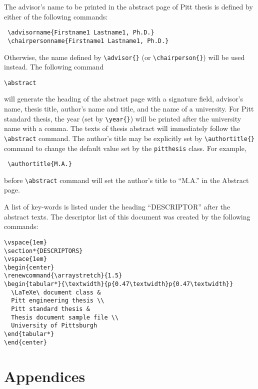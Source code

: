 The advisor's name to be printed in the abstract page of Pitt thesis is defined
by either of the following commands:
\begin{verbatim}
 \advisorname{Firstname1 Lastname1, Ph.D.}
 \chairpersonname{Firstname1 Lastname1, Ph.D.}
\end{verbatim}
Otherwise, the name defined by \verb|\advisor{}| (or \verb|\chairperson{}|) will be
used instead. The following command
\begin{verbatim}
\abstract
\end{verbatim}
will generate the heading of the abstract page with a signature field,
advisor's name, thesis title, author's name and title, and the name of
a university.	For Pitt standard thesis, the year (set by \verb|\year{}|)
will be printed after the university name with a comma.  The texts of thesis
abstract will immediately follow the \verb|\abstract| command.
The author's title may be explicitly set by \verb|\authortitle{}| command
to change the default value set by the \texttt{pitthesis} class.  For example,
\begin{verbatim}
 \authortitle{M.A.}
\end{verbatim}
before \verb|\abstract| command will set the author's title to ``M.A.'' in the
Abstract page.

A list of key-words is listed under the heading ``DESCRIPTOR'' after the
abstract texts.  The descriptor list of this document was created by the
following commands:
\begin{verbatim}
\vspace{1em}
\section*{DESCRIPTORS}
\vspace{1em}
\begin{center}
\renewcommand{\arraystretch}{1.5}
\begin{tabular*}{\textwidth}{p{0.47\textwidth}p{0.47\textwidth}}
  \LaTeXe\ document class &
  Pitt engineering thesis \\
  Pitt standard thesis &
  Thesis document sample file \\
  University of Pittsburgh
\end{tabular*}
\end{center}
\end{verbatim}

\section{Appendices}

